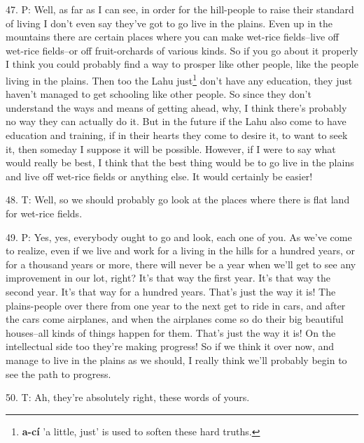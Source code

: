 47. P: Well, as far as I can see, in order for the hill-people to raise their standard
of living I don't even say they've got to go live in the plains. Even up in the
mountains there are certain places where you can make wet-rice fields--live off
wet-rice fields--or off fruit-orchards of various kinds. So if you go about it
properly I think you could probably find a way to prosper like other people, like
the people living in the plains. Then too the Lahu just\footnote{\textbf{a-cí} 'a little, just' is used to soften these hard truths.} don't have any education,
they just haven't managed to get schooling like other people. So since they don't
understand the ways and means of getting ahead, why, I think there's probably no
way they can actually do it. But in the future if the Lahu also come to have education
and training, if in their hearts they come to desire it, to want to seek it, then
someday I suppose it will be possible. However, if I were to say what would really
be best, I think that the best thing would be to go live in the plains and live
off wet-rice fields or anything else. It would certainly be easier!

48. T: Well, so we should probably go look at the places where there is flat land
for wet-rice fields.

49. P: Yes, yes, everybody ought to go and look, each one of you. As we've come
to realize, even if we live and work for a living in the hills for a hundred years,
or for a thousand years or more, there will never be a year when we'll get to see
any improvement in our lot, right? It's that way the first year. It's that way
the second year. It's that way for a hundred years. That's just the way it is!
The plains-people over there from one year to the next get to ride in cars, and
after the cars come airplanes, and when the airplanes come so do their big beautiful
houses--all kinds of things happen for them. That's just the way it is! On the
intellectual side too they're making progress! So if we think it over now, and
manage to live in the plains as we should, I really think we'll probably begin
to see the path to progress.

50. T: Ah, they're absolutely right, these words of yours.

